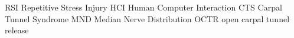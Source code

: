 	{RSI}	{Repetitive Stress Injury}
	{HCI}	{Human Computer Interaction}
   {CTS}   {Carpal Tunnel Syndrome}
   {MND}   {Median Nerve Distribution}
  {OCTR}  {open carpal tunnel release}